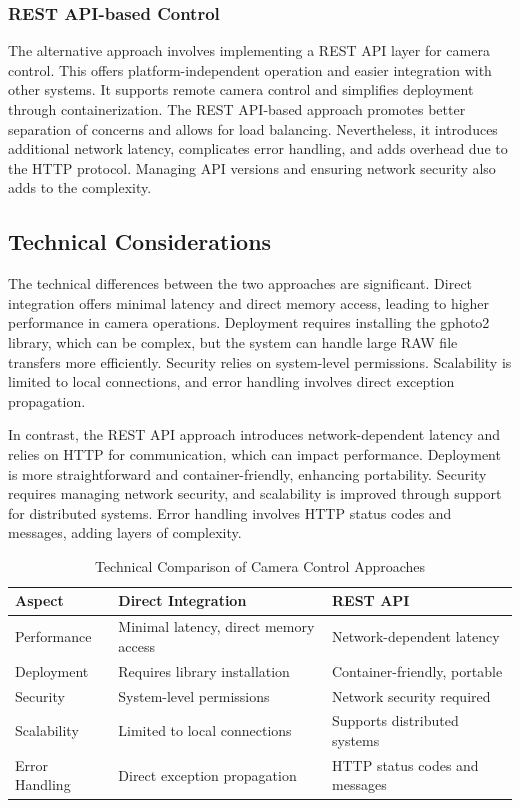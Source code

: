 \subsubsection{REST API-based Control}

The alternative approach involves implementing a REST API layer for camera control. This offers platform-independent operation and easier integration with other systems. It supports remote camera control and simplifies deployment through containerization. The REST API-based approach promotes better separation of concerns and allows for load balancing. Nevertheless, it introduces additional network latency, complicates error handling, and adds overhead due to the HTTP protocol. Managing API versions and ensuring network security also adds to the complexity.

\subsection{Technical Considerations}

The technical differences between the two approaches are significant. Direct integration offers minimal latency and direct memory access, leading to higher performance in camera operations. Deployment requires installing the gphoto2 library, which can be complex, but the system can handle large RAW file transfers more efficiently. Security relies on system-level permissions. Scalability is limited to local connections, and error handling involves direct exception propagation.

In contrast, the REST API approach introduces network-dependent latency and relies on HTTP for communication, which can impact performance. Deployment is more straightforward and container-friendly, enhancing portability. Security requires managing network security, and scalability is improved through support for distributed systems. Error handling involves HTTP status codes and messages, adding layers of complexity.

\begin{table}[h]
\centering
\begin{tabular}{|p{3cm}|p{5cm}|p{5cm}|}
\hline
\textbf{Aspect} & \textbf{Direct Integration} & \textbf{REST API} \\
\hline
Performance & Minimal latency, direct memory access & Network-dependent latency \\
\hline
Deployment & Requires library installation & Container-friendly, portable \\
\hline
Security & System-level permissions & Network security required \\
\hline
Scalability & Limited to local connections & Supports distributed systems \\
\hline
Error Handling & Direct exception propagation & HTTP status codes and messages \\
\hline
\end{tabular}
\caption{Technical Comparison of Camera Control Approaches}
\label{table:camera_control_comparison}
\end{table}

